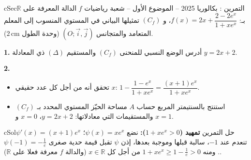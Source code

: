 \documentclass[12pt,a4paper]{article}
\newenvironment{BOX}[2]{\begin{otherlanguage}{english}\begin{arbox}{#1}{#2}}{\end{arbox}\end{otherlanguage}}
\newcounter{exo}
\newenvironment{tamrin}[1]{\stepcounter{exo}\begin{BOX}{cSec}{التمرين \theexo: #1}}{\end{BOX}}
\newenvironment{hal}{\Needspace{12\baselineskip}\begin{otherlanguage}{english}\begin{arbox}[breakable]{cSol}{حل التمرين \theexo}}{\end{arbox}\end{otherlanguage}}
\newcommand{\R}{\mathbb{R}}
\newenvironment{sq}{\begin{itemize}[leftmargin=2.4em,itemsep=3pt]}{\end{itemize}}
\newcommand{\qa}{\item[(أ)]}\newcommand{\qb}{\item[(ب)]}\newcommand{\qc}{\item[(جـ)]}\newcommand{\qd}{\item[(د)]}\newcommand{\qe}{\item[(هـ)]}
\newcommand{\QQ}[1]{\par\smallskip\textbf{#1.} }
\begin{document}
\begin{tamrin}{بكالوريا 2025 -- الموضوع الأول -- شعبة رياضيات}
$f$ الدالة المعرفة على $\R$ بـ: $f(x)=2x+\dfrac{2-2e^x}{1+xe^x}$، و $(C_f)$ تمثيلها البياني في المستوي المنسوب إلى المعلم المتعامد والمتجانس $(O;\vec i,\vec j)$ (وحدة الطول $2\,\text{cm}$).
\QQ{1} أدرس الوضع النسبي للمنحنى $(C_f)$ والمستقيم $(\Delta)$ ذي المعادلة $y=2x+2$.
\QQ{2}
\begin{sq}
\qa تحقق أنه من أجل كل عدد حقيقي $x$: $1-\dfrac{1-e^x}{1+xe^x}=\dfrac{(x+1)e^x}{1+xe^x}$.
\qb استنتج بالسنتيمتر المربع حساب $A$ مساحة الحيّز المستوي المحدد بـ $(C_f)$ والمستقيمات التي معادلاتها: $y=2x+2$، $x=0$ و $x=1$.
\end{sq}
\end{tamrin}

\begin{hal}
\textbf{تمهيد ($1+xe^x>0$):} نضع $\psi(x)=xe^x$؛ $\psi'(x)=(x+1)e^x$ تنعدم عند $-1$، سالبة قبلها وموجبة بعدها، إذن $\psi$ تقبل قيمة حدية صغرى $\psi(-1)=-\frac1e$. ومنه $1+xe^x\ge1-\frac1e>0$ من أجل كل $x\in\R$ (والدالة $f$ معرفة فعلا على $\R$).


\end{hal}
\end{document}

